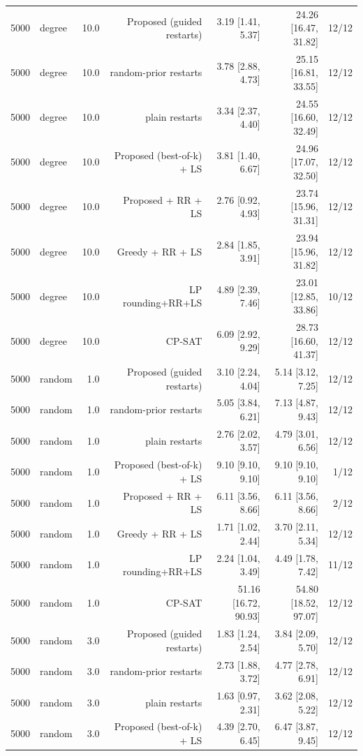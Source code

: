 \begin{table}[t]
\begin{tabular}{llrrrrr}
5000 & degree & 10.0 & Proposed (guided restarts) & 3.19 [1.41, 5.37] & 24.26 [16.47, 31.82] & 12/12 \\
5000 & degree & 10.0 & random-prior restarts & 3.78 [2.88, 4.73] & 25.15 [16.81, 33.55] & 12/12 \\
5000 & degree & 10.0 & plain restarts & 3.34 [2.37, 4.40] & 24.55 [16.60, 32.49] & 12/12 \\
5000 & degree & 10.0 & Proposed (best-of-k) + LS & 3.81 [1.40, 6.67] & 24.96 [17.07, 32.50] & 12/12 \\
5000 & degree & 10.0 & Proposed + RR + LS & 2.76 [0.92, 4.93] & 23.74 [15.96, 31.31] & 12/12 \\
5000 & degree & 10.0 & Greedy + RR + LS & 2.84 [1.85, 3.91] & 23.94 [15.96, 31.82] & 12/12 \\
5000 & degree & 10.0 & LP rounding+RR+LS & 4.89 [2.39, 7.46] & 23.01 [12.85, 33.86] & 10/12 \\
5000 & degree & 10.0 & CP-SAT & 6.09 [2.92, 9.29] & 28.73 [16.60, 41.37] & 12/12 \\
5000 & random & 1.0 & Proposed (guided restarts) & 3.10 [2.24, 4.04] & 5.14 [3.12, 7.25] & 12/12 \\
5000 & random & 1.0 & random-prior restarts & 5.05 [3.84, 6.21] & 7.13 [4.87, 9.43] & 12/12 \\
5000 & random & 1.0 & plain restarts & 2.76 [2.02, 3.57] & 4.79 [3.01, 6.56] & 12/12 \\
5000 & random & 1.0 & Proposed (best-of-k) + LS & 9.10 [9.10, 9.10] & 9.10 [9.10, 9.10] & 1/12 \\
5000 & random & 1.0 & Proposed + RR + LS & 6.11 [3.56, 8.66] & 6.11 [3.56, 8.66] & 2/12 \\
5000 & random & 1.0 & Greedy + RR + LS & 1.71 [1.02, 2.44] & 3.70 [2.11, 5.34] & 12/12 \\
5000 & random & 1.0 & LP rounding+RR+LS & 2.24 [1.04, 3.49] & 4.49 [1.78, 7.42] & 11/12 \\
5000 & random & 1.0 & CP-SAT & 51.16 [16.72, 90.93] & 54.80 [18.52, 97.07] & 12/12 \\
5000 & random & 3.0 & Proposed (guided restarts) & 1.83 [1.24, 2.54] & 3.84 [2.09, 5.70] & 12/12 \\
5000 & random & 3.0 & random-prior restarts & 2.73 [1.88, 3.72] & 4.77 [2.78, 6.91] & 12/12 \\
5000 & random & 3.0 & plain restarts & 1.63 [0.97, 2.31] & 3.62 [2.08, 5.22] & 12/12 \\
5000 & random & 3.0 & Proposed (best-of-k) + LS & 4.39 [2.70, 6.45] & 6.47 [3.87, 9.45] & 12/12 \\

\end{tabular}
\end{table}
